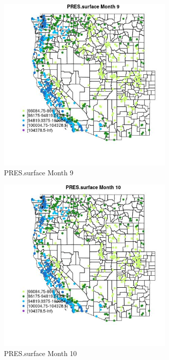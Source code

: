\begin{figure} 
\centering  
\includegraphics[width=0.77\textwidth]{Code_Outputs/Report_ML_input_PM25_Step4_part_e_de_duplicated_aves_compiled_2019-05-21wNAs_MapObsMo9PRESsurface.jpg} 
\caption{\label{fig:Report_ML_input_PM25_Step4_part_e_de_duplicated_aves_compiled_2019-05-21wNAsMapObsMo9PRESsurface}PRES.surface Month 9} 
\end{figure} 
 

\begin{figure} 
\centering  
\includegraphics[width=0.77\textwidth]{Code_Outputs/Report_ML_input_PM25_Step4_part_e_de_duplicated_aves_compiled_2019-05-21wNAs_MapObsMo10PRESsurface.jpg} 
\caption{\label{fig:Report_ML_input_PM25_Step4_part_e_de_duplicated_aves_compiled_2019-05-21wNAsMapObsMo10PRESsurface}PRES.surface Month 10} 
\end{figure} 
 

